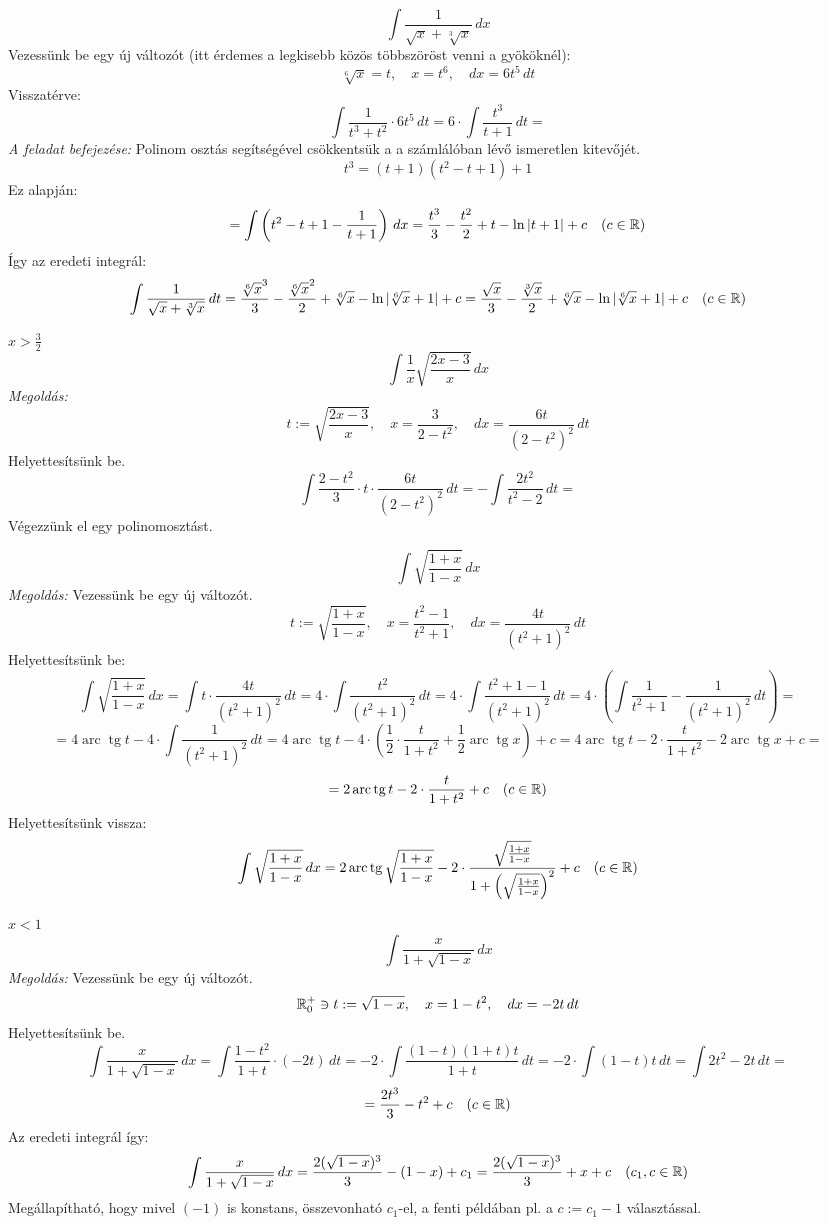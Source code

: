 \documentclass[a4paper,11.5pt]{article}
\DeclareMathOperator{\tg}{tg}
\DeclareMathOperator{\arc}{arc}
\begin{document}
	\begin{exercise}
		\[ \int\frac{1}{\sqrt{x}+\sqrt[3]{x}}\,dx \]
		Vezessünk be egy új változót (itt érdemes a legkisebb közös többszöröst venni a gyököknél):
		\[ \sqrt[6]{x}=t,\quad x=t^6,\quad dx=6t^5\,dt \]
		Visszatérve:
		\[ \int\frac{1}{t^3+t^2}\cdot6t^5\,dt=6\cdot\int\frac{t^3}{t+1}\,dt= \]
		\textit{A feladat befejezése:} Polinom osztás segítségével csökkentsük a a számlálóban lévő ismeretlen kitevőjét.
		\[ t^3=(t+1)(t^2-t+1)+1 \]
		Ez alapján:
		\[ =\int\left(t^2-t+1-\frac{1}{t+1}\right)\,dx=\frac{t^3}{3}-\frac{t^2}{2}+t-\ln|t+1|+c\quad (c\in\mathbb{R}) \]
		Így az eredeti integrál:
		\[ \int\frac{1}{\sqrt{x}+\sqrt[3]{x}}\,dt=\frac{\sqrt[6]{x}^3}{3}-\frac{\sqrt[6]{x}^2}{2}+\sqrt[6]{x}-\ln|\sqrt[6]{x}+1|+c=\frac{\sqrt{x}}{3}-\frac{\sqrt[3]{x}}{2}+\sqrt[6]{x}-\ln|\sqrt[6]{x}+1|+c\quad (c\in\mathbb{R}) \]
	\end{exercise}
	\begin{exercise}$x>\frac{3}{2}$
		\[ \int\frac{1}{x}\sqrt{\frac{2x-3}{x}}\,dx \]
		\textit{Megoldás:}
		\[ t:=\sqrt{\frac{2x-3}{x}},\quad x=\frac{3}{2-t^2},\quad dx=\frac{6t}{(2-t^2)^2}\,dt \]
		Helyettesítsünk be.
		\[ \int\frac{2-t^2}{3}\cdot t\cdot\frac{6t}{(2-t^2)^2}\,dt=-\int\frac{2t^2}{t^2-2}\,dt=\]
		Végezzünk el egy polinomosztást.
		\[  \]
	\end{exercise}
	\begin{exercise}
		\[ \int\sqrt{\frac{1+x}{1-x}}\,dx \]
		\textit{Megoldás:} Vezessünk be egy új változót.
		\[ t:=\sqrt{\frac{1+x}{1-x}},\quad x=\frac{t^2-1}{t^2+1},\quad dx=\frac{4t}{\left(t^2+1\right)^2}\,dt \]
		Helyettesítsünk be:
		\[ \int\sqrt{\frac{1+x}{1-x}}\,dx=\int t\cdot\frac{4t}{(t^2+1)^2}\,dt=4\cdot\int\frac{t^2}{(t^2+1)^2}\,dt=4\cdot\int\frac{t^2+1-1}{(t^2+1)^2}\,dt=4\cdot\left(\int\frac{1}{t^2+1}-\frac{1}{(t^2+1)^2}\,dt\right)= \]
		\[ =4\arc\tg t-4\cdot\int\frac{1}{(t^2+1)^2}\,dt=4\arc\tg t-4\cdot\left( \frac{1}{2}\cdot\frac{t}{1+t^2}+\frac{1}{2}\arc\tg x\right)+c =4\arc\tg t-2\cdot\frac{t}{1+t^2}-2\arc\tg x+c= \]
		\[ =2\arc\tg t-2\cdot\frac{t}{1+t^2}+c\quad (c\in\R) \]
		Helyettesítsünk vissza:
		\[ \int\sqrt{\frac{1+x}{1-x}}\,dx=2\arc\tg \sqrt{\frac{1+x}{1-x}}-2\cdot\frac{\sqrt{\frac{1+x}{1-x}}}{1+\left(\sqrt{\frac{1+x}{1-x}}	\right)^2}+c\quad (c\in\R) \]
	\end{exercise}
	\begin{exercise}$x<1$
		\[ \int\frac{x}{1+\sqrt{1-x}}\,dx \]
		\textit{Megoldás:} Vezessünk be egy új változót.
		\[ \mathbb{R}_0^+\ni t:=\sqrt{1-x},\quad x=1-t^2,\quad dx=-2t\,dt \]
		Helyettesítsünk be.
		\[ \int\frac{x}{1+\sqrt{1-x}}\,dx=\int\frac{1-t^2}{1+t}\cdot\left(-2t\right)\,dt=-2\cdot\int\frac{(1-t)(1+t)t}{1+t}\,dt=-2\cdot\int (1-t)t\,dt=\int 2t^2-2t\,dt= \]
		\[ =\frac{2t^3}{3}-t^2+c\quad (c\in\mathbb{R}) \]
		Az eredeti integrál így:
		\[ \int\frac{x}{1+\sqrt{1-x}}\,dx=\frac{2(\sqrt{1-x})^3}{3}-(1-x)+c_1=\frac{2(\sqrt{1-x})^3}{3}+x+c\quad  (c_1,c\in\mathbb{R}) \]
		Megállapítható, hogy mivel $(-1)$ is konstans, összevonható $c_1$-el, a fenti példában pl. a $c:=c_1-1$ választással.
	\end{exercise}
\end{document}
